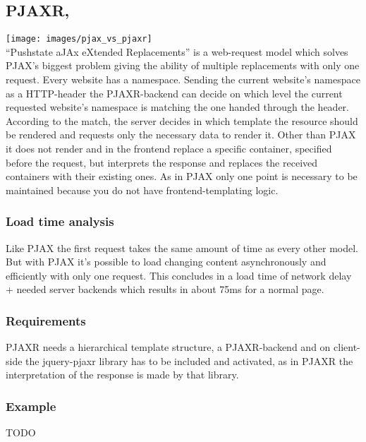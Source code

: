 \documentclass[f,bachelor,binding,twoside,palatino]{WeSTthesis}
\def \pjax {PJAX}
\def \pjaxr {PJAXR}
\begin{document}
  \subsection{\pjaxr{}, \label{pjaxr}}
    \texttt{[image: images/pjax\_vs\_pjaxr]}\\
    \enquote{Pushstate aJAx eXtended Replacements} is a web-request model which solves \pjax{}'s biggest problem giving the ability of multiple replacements with only one request. 
    Every website has a namespace. Sending the current website's namespace as a HTTP-header the \pjaxr{}-backend can decide on which level the current requested website's namespace is matching the one handed through the header. According to the match, the server decides in which template the resource should be rendered and requests only the necessary data to render it. Other than \pjax{} it does not render and in the frontend replace a specific container, specified before the request, but interprets the response and replaces the received containers with their existing ones. As in \pjax{} only one point is necessary to be maintained because you do not have frontend-templating logic.

    \subsubsection{Load time analysis}
      Like \pjax{} the first request takes the same amount of time as every other model. But with \pjax{} it's possible to load changing content asynchronously and efficiently with only one request. This concludes in a load time of network delay + needed server backends which results in about 75ms for a normal page.
    
    \subsubsection{Requirements}
    \pjaxr{} needs a hierarchical template structure, a \pjaxr{}-backend and on client-side the jquery-pjaxr library has to be included and activated, as in \pjaxr{} the interpretation of the response is made by that library.

    \subsubsection{Example}
    TODO
      
\end{document}
